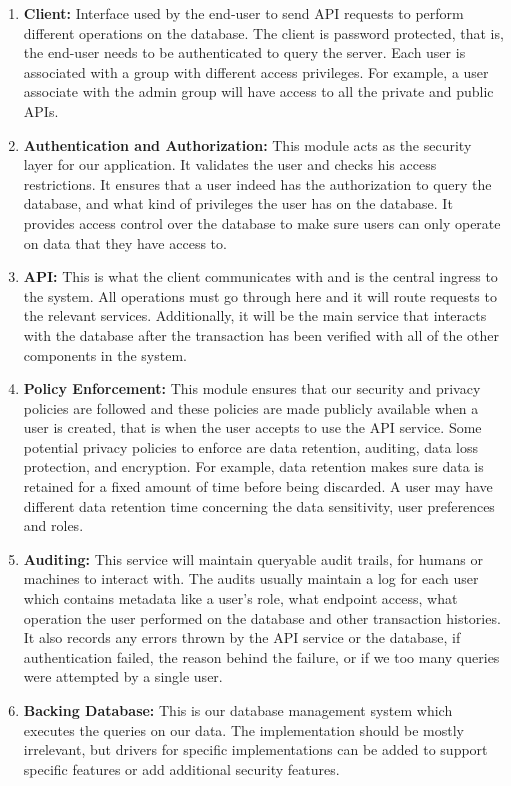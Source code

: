 \documentclass[sigconf]{acmart}
\begin{document}
\begin{enumerate}
    \item \textbf{Client:} Interface used by the end-user to send API requests to perform different operations on the database. The client is password protected, that is, the end-user needs to be authenticated to query the server. Each user is associated with a group with different access privileges. For example, a user associate with the admin group will have access to all the private and public APIs.
    \item \textbf{Authentication and Authorization:} This module acts as the security layer for our application. It validates the user and checks his access restrictions. It ensures that a user indeed has the authorization to query the database, and what kind of privileges the user has on the database. It provides access control over the database to make sure users can only operate on data that they have access to.
    \item \textbf{API:} This is what the client communicates with and is the central ingress to the system. All operations must go through here and it will route requests to the relevant services. Additionally, it will be the main service that interacts with the database after the transaction has been verified with all of the other components in the system.
    \item \textbf{Policy Enforcement:} This module ensures that our security and privacy policies are followed and these policies are made publicly available when a user is created, that is when the user accepts to use the API service. Some potential privacy policies to enforce are data retention, auditing, data loss protection, and encryption. For example, data retention makes sure data is retained for a fixed amount of time before being discarded. A user may have different data retention time concerning the data sensitivity, user preferences and roles. 
    \item \textbf{Auditing:} This service will maintain queryable audit trails, for humans or machines to interact with. The audits usually maintain a log for each user which contains metadata like a user's role, what endpoint access, what operation the user performed on the database and other transaction histories. It also records any errors thrown by the API service or the database, if authentication failed, the reason behind the failure, or if we too many queries were attempted by a single user.
    \item \textbf{Backing Database:} This is our database management system which executes the queries on our data. The implementation should be mostly irrelevant, but drivers for specific implementations can be added to support specific features or add additional security features.  
\end{enumerate}
\end{document}
